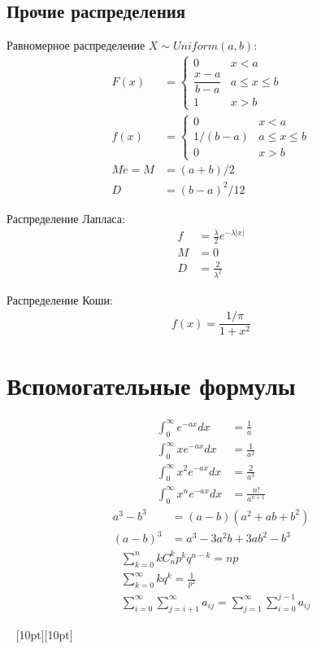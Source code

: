 \documentclass[a4paper,12pt,fleqn]{article}
\numberwithin{figure}{section}
\theoremstyle{definition}
\let\leqs\leqslant
\def\vignette{\vspace{48pt} \noindent \hrulefill~
	          \raisebox{-8pt}[10pt][10pt]{\Huge\ding{102}}
	          ~\hrulefill}
\begin{document}
\subsection{Прочие распределения}

Равномерное распределение $X \sim Uniform(a,b)$:
\begin{align*}
	   F(x) &=
	   		\begin{cases}
	   			0	& x<a \\
		   		\dfrac{x-a}{b-a}	& a \leqs x \leqs b \\
		   		1	& x>b
			\end{cases}
	\\ f(x) &= \begin{cases}
				0		& x<a \\
				1/(b-a)	& a \leqs x \leqs b \\
				0		& x>b
			\end{cases}
	\\ Me = M &= (a+b)/2
	\\ D &= (b-a)^2/12
\end{align*}


Распределение Лапласа:
\begin{align*}
	   f &= \frac{\lambda}2 e^{-\lambda|x|}
	\\ M &= 0
	\\ D &= \frac{2}{\lambda^2}
\end{align*}


Распределение Коши:
\begin{align*}
	   f(x)=\dfrac{1/\pi}{1+x^2}
\end{align*}


\section{Вспомогательные формулы}

\begin{align*}
	   \int_0^\infty     e^{-ax}dx &= \frac{1}{a}
	\\ \int_0^\infty x   e^{-ax}dx &= \frac{1}{a^2}
	\\ \int_0^\infty x^2 e^{-ax}dx &= \frac{2}{a^3}
	\\ \int_0^\infty x^n e^{-ax}dx &= \frac{n!}{a^{n+1}}
\end{align*}
\begin{align*}
	   a^3-b^3 &= (a-b)(a^2+ab+b^2)
	\\ (a-b)^3 &= a^3-3a^2b+3ab^2-b^3
\end{align*}
\begin{align*}
&	\sum_{k=0}^n k C_n^k p^k q^{n-k} = np \\
&	\sum_{k=0}^{\infty}kq^k = \frac{1}{p^2} \\
&	\sum_{i=0}^{\infty}\sum_{j=i+1}^{\infty}a_{ij} =
	\sum_{j=1}^{\infty}\sum_{i=0}^{j-1}a_{ij}
\end{align*}

\vignette
\end{document}
